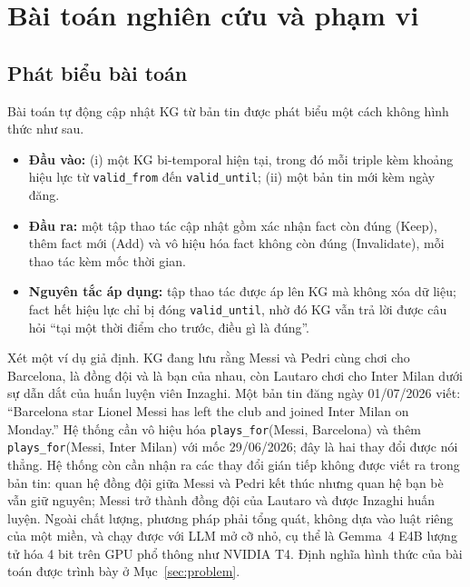 \section{Bài toán nghiên cứu và phạm vi}
\label{sec:intro-problem}

\subsection{Phát biểu bài toán}
\label{sec:intro-statement}

Bài toán tự động cập nhật KG từ bản tin được phát biểu một cách không hình thức như sau.

\begin{itemize}
  \item \textbf{Đầu vào:} (i) một KG bi-temporal hiện tại, trong đó mỗi triple kèm khoảng hiệu lực
  từ \texttt{valid\_from} đến \texttt{valid\_until}; (ii) một bản tin mới kèm ngày đăng.
  \item \textbf{Đầu ra:} một tập thao tác cập nhật gồm xác nhận fact còn đúng (Keep),
  thêm fact mới (Add) và vô hiệu hóa fact không còn đúng (Invalidate), mỗi thao tác kèm mốc thời gian.
  \item \textbf{Nguyên tắc áp dụng:} tập thao tác được áp lên KG mà không xóa dữ liệu; fact hết hiệu lực chỉ bị đóng \texttt{valid\_until},
  nhờ đó KG vẫn trả lời được câu hỏi ``tại một thời điểm cho trước, điều gì là đúng''.
\end{itemize}

Xét một ví dụ giả định. KG đang lưu rằng Messi và Pedri cùng chơi cho Barcelona, là đồng đội và là bạn của nhau,
còn Lautaro chơi cho Inter Milan dưới sự dẫn dắt của huấn luyện viên Inzaghi.
Một bản tin đăng ngày 01/07/2026 viết: ``Barcelona star Lionel Messi has left the club and joined Inter Milan on Monday.''
Hệ thống cần vô hiệu hóa \texttt{plays\_for}(Messi, Barcelona)
và thêm \texttt{plays\_for}(Messi, Inter Milan) với mốc 29/06/2026; đây là hai thay đổi được nói thẳng.
Hệ thống còn cần nhận ra các thay đổi gián tiếp không được viết ra trong bản tin:
quan hệ đồng đội giữa Messi và Pedri kết thúc nhưng quan hệ bạn bè vẫn giữ nguyên;
Messi trở thành đồng đội của Lautaro và được Inzaghi huấn luyện.
Ngoài chất lượng, phương pháp phải tổng quát, không dựa vào luật riêng của một miền,
và chạy được với LLM mở cỡ nhỏ, cụ thể là Gemma~4 E4B lượng tử hóa 4 bit \cite{gemma4} trên GPU phổ thông như NVIDIA T4.
Định nghĩa hình thức của bài toán được trình bày ở Mục~\ref{sec:problem}.

